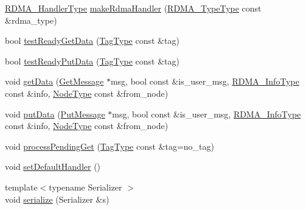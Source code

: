 \begin{DoxyCompactItemize}
\item 
\hyperlink{namespacevt_a9530efb893c0f3846e8ac5f0507e0f49}{R\+D\+M\+A\+\_\+\+Handler\+Type} \hyperlink{structvt_1_1rdma_1_1_state_ab82d3a9820bcee1238ab726ae79eb4e0}{make\+Rdma\+Handler} (\hyperlink{namespacevt_1_1rdma_ac848e1d9da43db6294bd06f83e5d3946}{R\+D\+M\+A\+\_\+\+Type\+Type} const \&rdma\+\_\+type)
\item 
bool \hyperlink{structvt_1_1rdma_1_1_state_aca75303aab9cc0650fd774048e59239e}{test\+Ready\+Get\+Data} (\hyperlink{namespacevt_a84ab281dae04a52a4b243d6bf62d0e52}{Tag\+Type} const \&tag)
\item 
bool \hyperlink{structvt_1_1rdma_1_1_state_a4fc0ac910f62594cc74a82646b9b1d88}{test\+Ready\+Put\+Data} (\hyperlink{namespacevt_a84ab281dae04a52a4b243d6bf62d0e52}{Tag\+Type} const \&tag)
\item 
void \hyperlink{structvt_1_1rdma_1_1_state_aff23d68ef3e0c30c6f2526bb50976148}{get\+Data} (\hyperlink{namespacevt_1_1rdma_acce0da4c9ea1233c3f132c1971943653}{Get\+Message} $\ast$msg, bool const \&is\+\_\+user\+\_\+msg, \hyperlink{structvt_1_1rdma_1_1_state_a6a78216795efe7fb6966c33b1a21d7cf}{R\+D\+M\+A\+\_\+\+Info\+Type} const \&info, \hyperlink{namespacevt_a866da9d0efc19c0a1ce79e9e492f47e2}{Node\+Type} const \&from\+\_\+node)
\item 
void \hyperlink{structvt_1_1rdma_1_1_state_ae18479c7e33e4f99d3c19bf6dc14102d}{put\+Data} (\hyperlink{namespacevt_1_1rdma_ae0a0330c647ec5ac5d508750f4cd4a06}{Put\+Message} $\ast$msg, bool const \&is\+\_\+user\+\_\+msg, \hyperlink{structvt_1_1rdma_1_1_state_a6a78216795efe7fb6966c33b1a21d7cf}{R\+D\+M\+A\+\_\+\+Info\+Type} const \&info, \hyperlink{namespacevt_a866da9d0efc19c0a1ce79e9e492f47e2}{Node\+Type} const \&from\+\_\+node)
\item 
void \hyperlink{structvt_1_1rdma_1_1_state_aa77318390a2d1afd1435d748971daa75}{process\+Pending\+Get} (\hyperlink{namespacevt_a84ab281dae04a52a4b243d6bf62d0e52}{Tag\+Type} const \&tag=no\+\_\+tag)
\item 
void \hyperlink{structvt_1_1rdma_1_1_state_a10c5e2a2694f75e2515667815c236888}{set\+Default\+Handler} ()
\item 
{\footnotesize template$<$typename Serializer $>$ }\\void \hyperlink{structvt_1_1rdma_1_1_state_a193e44770e29b8aeba4d67cc70b7fde4}{serialize} (Serializer \&s)
\end{DoxyCompactItemize}
